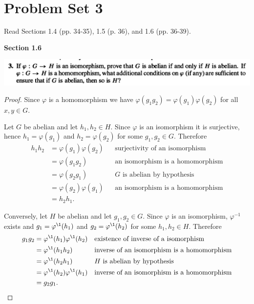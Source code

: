 \section*{Problem  Set 3}

Read Sections 1.4 (pp. 34-35), 1.5 (p. 36), and 1.6 (pp. 36-39).


{\bf Section 1.6}\\

\begin{mdframed}
\includegraphics[width=400pt]{img/abstract-algebra--nf--3-4cd9.png}
\end{mdframed}

\begin{proof}
  Since $\varphi$ is a homomorphism we have $\varphi(g_1g_2) = \varphi(g_1)\varphi(g_2)$ for all $x, y \in G$.

  Let $G$ be abelian and let $h_1, h_2 \in H$. Since $\varphi$ is an isomorphism it is surjective,
  hence $h_1 = \varphi(g_1)$ and $h_2 = \varphi(g_2)$ for some $g_1, g_2 \in G$. Therefore
  \begin{align*}
    h_1h_2 &= \varphi(g_1)\varphi(g_2)    &&\text{surjectivity of an isomorphism}\\
           &= \varphi(g_1g_2)       &&\text{an isomorphism is a homomorphism}\\
           &= \varphi(g_2g_1)       &&\text{$G$ is abelian by hypothesis}\\
           &= \varphi(g_2)\varphi(g_1)    &&\text{an isomorphism is a homomorphism}\\
           &= h_2h_1.
  \end{align*}


  Conversely, let $H$ be abelian and let $g_1, g_2 \in G$. Since $\varphi$ is an isomorphism,
  $\varphi^{-1}$ exists and $g_1 = \varphi^\1(h_1)$ and $g_2 = \varphi^\1(h_2)$ for some $h_1, h_2 \in H$. Therefore
  \begin{align*}
    g_1g_2 &= \varphi^\1(h_1)\varphi^\1(h_2)    &&\text{existence of inverse of a isomorphism} \\
           &= \varphi^\1(h_1h_2)          &&\text{inverse of an isomorphism is a homomorphism} \\
           &=  \varphi^\1(h_2h_1)         &&\text{$H$ is abelian by hypothesis} \\
           &=  \varphi^\1(h_2)\varphi^\1(h_1)    &&\text{inverse of an isomorphism is a homomorphism} \\
           &= g_2g_1.
  \end{align*}

\end{proof}



